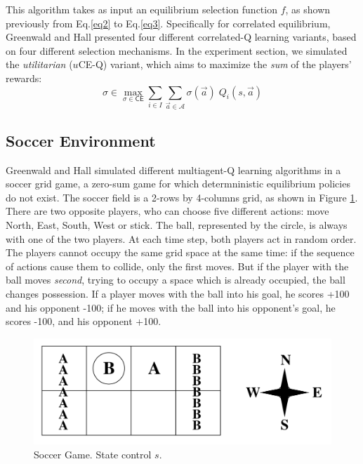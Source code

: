 \documentclass{article}
\begin{document}
    This algorithm takes as input an equilibrium selection function $f$, as shown previously from Eq.\ref{eq2} to Eq.\ref{eq3}.
    Specifically for correlated equilibrium, Greenwald and Hall presented four different correlated-Q learning variants, based on four different selection mechanisms.
    In the experiment section, we simulated the \emph{utilitarian} ($u$CE-Q) variant, which aims to maximize the \emph{sum} of the players' rewards:
    \begin{equation}
        \sigma \in \max_{\sigma \in \mathsf{CE}} \sum_{i \in I} \sum_{\vec{a} \in \mathcal{A}} \sigma(\vec{a}) \; Q_{i}(s, \vec{a})
    \end{equation}

    \subsection{Soccer Environment}
    \label{subsec:soccer}
    Greenwald and Hall simulated different multiagent-Q learning algorithms in a soccer grid game, a zero-sum game for which determninistic equilibrium policies do not exist.
    The soccer field is a 2-rows by 4-columns grid, as shown in Figure \ref{fig1}.
    There are two opposite players, who can choose five different actions: move North, East, South, West or stick.
    The ball, represented by the circle, is always with one of the two players.
    At each time step, both players act in random order.
    The players cannot occupy the same grid space at the same time: if the sequence of actions cause them to collide, only the first moves.
    But if the player with the ball moves \emph{second}, trying to occupy a space which is already occupied, the ball changes possession.
    If a player moves with the ball into his goal, he scores +100 and his opponent -100;
    if he moves with the ball into his opponent's goal, he scores -100, and his opponent +100.

    \begin{figure}[t]
        \includegraphics[scale=0.15]{./images/figure1.png}
        \centering
        \caption{Soccer Game.
        State control $s$.}
        \label{fig1}
    \end{figure}
\end{document}
